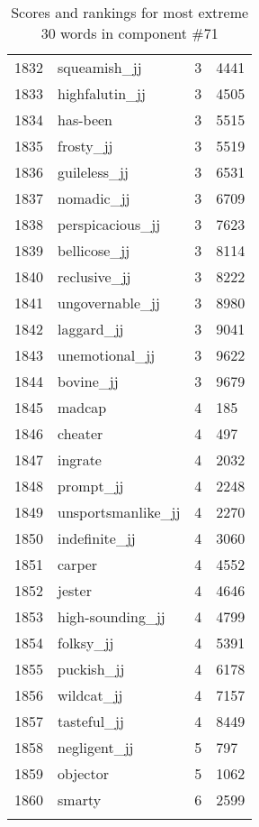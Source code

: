 \begin{longtable}[!htbp]{| rlr@{.}l |}
    1832 & squeamish\_jj & 3 & 4441 \\
    1833 & highfalutin\_jj & 3 & 4505 \\
    1834 & has-been & 3 & 5515 \\
    1835 & frosty\_jj & 3 & 5519 \\
    1836 & guileless\_jj & 3 & 6531 \\
    1837 & nomadic\_jj & 3 & 6709 \\
    1838 & perspicacious\_jj & 3 & 7623 \\
    1839 & bellicose\_jj & 3 & 8114 \\
    1840 & reclusive\_jj & 3 & 8222 \\
    1841 & ungovernable\_jj & 3 & 8980 \\
    1842 & laggard\_jj & 3 & 9041 \\
    1843 & unemotional\_jj & 3 & 9622 \\
    1844 & bovine\_jj & 3 & 9679 \\
    1845 & madcap & 4 & 185 \\
    1846 & cheater & 4 & 497 \\
    1847 & ingrate & 4 & 2032 \\
    1848 & prompt\_jj & 4 & 2248 \\
    1849 & unsportsmanlike\_jj & 4 & 2270 \\
    1850 & indefinite\_jj & 4 & 3060 \\
    1851 & carper & 4 & 4552 \\
    1852 & jester & 4 & 4646 \\
    1853 & high-sounding\_jj & 4 & 4799 \\
    1854 & folksy\_jj & 4 & 5391 \\
    1855 & puckish\_jj & 4 & 6178 \\
    1856 & wildcat\_jj & 4 & 7157 \\
    1857 & tasteful\_jj & 4 & 8449 \\
    1858 & negligent\_jj & 5 & 797 \\
    1859 & objector & 5 & 1062 \\
    1860 & smarty & 6 & 2599 \\
    \hline
    \caption{Scores and rankings for most extreme 30 words in component \#71} \\
\end{longtable}
